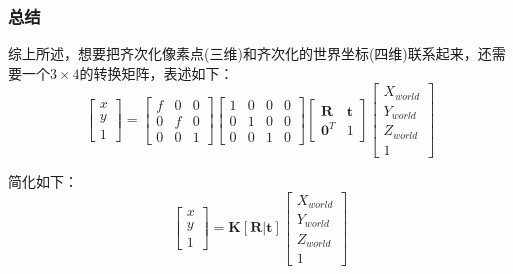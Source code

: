 \documentclass[12pt]{article}
\begin{document}
\subsubsection{总结}
综上所述，想要把齐次化像素点(三维)和齐次化的世界坐标(四维)联系起来，还需要一个$3\times 4$的转换矩阵，表述如下：
\begin{equation}
    \left[\begin{array}{l}
        x \\
        y \\
        1
        \end{array}\right]=\left[\begin{array}{lll}
        f & 0 & 0 \\
        0 & f & 0 \\
        0 & 0 & 1
        \end{array}\right]\left[\begin{array}{llll}
        1 & 0 & 0 & 0 \\
        0 & 1 & 0 & 0 \\
        0 & 0 & 1 & 0
        \end{array}\right]\left[\begin{array}{cc}
        \mathbf{R} & \mathbf{t} \\
        \mathbf{0}^{T} & 1
        \end{array}\right]\left[\begin{array}{c}
        X_{world} \\
        Y_{world} \\
        Z_{world} \\
        1
        \end{array}\right]
\end{equation}

简化如下：
\begin{equation}
    \left[
        \begin{array}{l}
            x \\
            y \\
            1
        \end{array}
    \right]=
    \mathbf{K}\left[\mathbf{R|\mathbf{t}}\right]\left[
        \begin{array}{l}
            X_{world} \\
            Y_{world} \\
            Z_{world} \\
            1
        \end{array}
    \right]
\end{equation}
\end{document}
